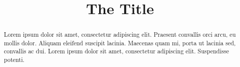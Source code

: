 \documentclass[letterpaper,UKenglish,anonymous]{lipics-v2021}
\title{The Title}
\begin{document}
\maketitle

\begin{abstract}
Lorem ipsum dolor sit amet, consectetur adipiscing elit. Praesent convallis orci arcu, eu mollis dolor. Aliquam eleifend suscipit lacinia. Maecenas quam mi, porta ut lacinia sed, convallis ac dui. Lorem ipsum dolor sit amet, consectetur adipiscing elit. Suspendisse potenti. 
\end{abstract}







\end{document}
